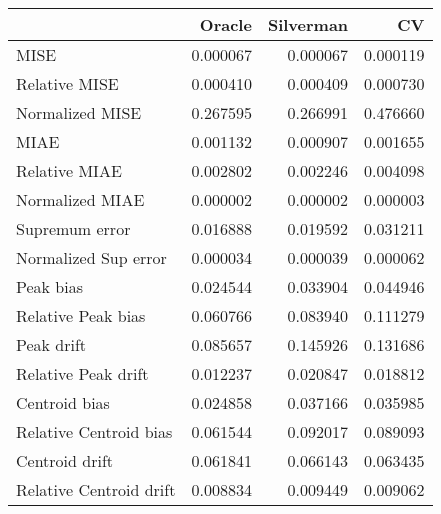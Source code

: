 \begin{tabular}{lrrr}
  \toprule
 & Oracle & Silverman & CV \\ 
  \midrule
MISE & 0.000067 & 0.000067 & 0.000119 \\ 
  Relative MISE & 0.000410 & 0.000409 & 0.000730 \\ 
  Normalized MISE & 0.267595 & 0.266991 & 0.476660 \\ 
  MIAE & 0.001132 & 0.000907 & 0.001655 \\ 
  Relative MIAE & 0.002802 & 0.002246 & 0.004098 \\ 
  Normalized MIAE & 0.000002 & 0.000002 & 0.000003 \\ 
  Supremum error & 0.016888 & 0.019592 & 0.031211 \\ 
  Normalized Sup error & 0.000034 & 0.000039 & 0.000062 \\ 
  Peak bias & 0.024544 & 0.033904 & 0.044946 \\ 
  Relative Peak bias & 0.060766 & 0.083940 & 0.111279 \\ 
  Peak drift & 0.085657 & 0.145926 & 0.131686 \\ 
  Relative Peak drift & 0.012237 & 0.020847 & 0.018812 \\ 
  Centroid bias & 0.024858 & 0.037166 & 0.035985 \\ 
  Relative Centroid bias & 0.061544 & 0.092017 & 0.089093 \\ 
  Centroid drift & 0.061841 & 0.066143 & 0.063435 \\ 
  Relative Centroid drift & 0.008834 & 0.009449 & 0.009062 \\ 
   \bottomrule
\end{tabular}

